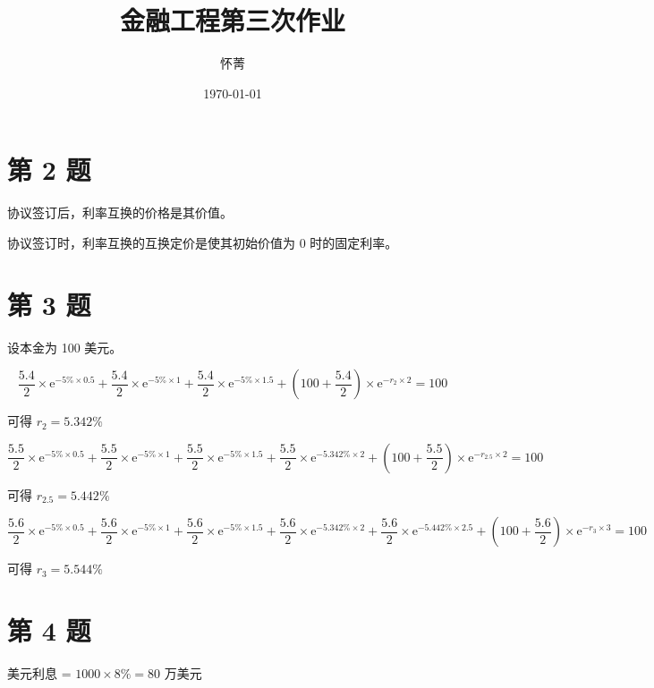 \documentclass{article}
\title{金融工程第三次作业}
\author{怀菁}
\date{\today}
\begin{document}
\maketitle

\section*{第 2 题}

协议签订后，利率互换的价格是其价值。

协议签订时，利率互换的互换定价是使其初始价值为 0 时的固定利率。

\section*{第 3 题}

设本金为 100 美元。

\begin{equation}
    \frac{5.4}{2} \times\mathrm{e}^{-5\%\times0.5} + \frac{5.4}{2} \times\mathrm{e}^{-5\%\times1} + \frac{5.4}{2} \times\mathrm{e}^{-5\%\times1.5} + (100+\frac{5.4}{2}) \times\mathrm{e}^{-r_2\times2} = 100
\end{equation}

可得 $r_2=5.342\%$

\begin{equation}
    \frac{5.5}{2} \times\mathrm{e}^{-5\%\times0.5} + \frac{5.5}{2} \times\mathrm{e}^{-5\%\times1} + \frac{5.5}{2} \times\mathrm{e}^{-5\%\times1.5} + \frac{5.5}{2} \times\mathrm{e}^{-5.342\%\times2} + (100+\frac{5.5}{2}) \times\mathrm{e}^{-r_{2.5}\times2} = 100
\end{equation}

可得 $r_{2.5}=5.442\%$

\begin{equation}
    \frac{5.6}{2} \times\mathrm{e}^{-5\%\times0.5} + \frac{5.6}{2} \times\mathrm{e}^{-5\%\times1} + \frac{5.6}{2} \times\mathrm{e}^{-5\%\times1.5} + \frac{5.6}{2} \times\mathrm{e}^{-5.342\%\times2} + \frac{5.6}{2} \times\mathrm{e}^{-5.442\%\times2.5} + (100+\frac{5.6}{2}) \times\mathrm{e}^{-r_{3}\times3} = 100
\end{equation}

可得 $r_3=5.544\%$

\section*{第 4 题}

美元利息 = $1000\times8\%=80$ 万美元
\end{document}
